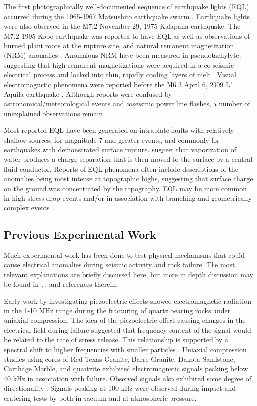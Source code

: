 The first photographically well-documented sequence of earthquake lights (EQL) occurred during the 1965-1967 Matsushiro earthquake swarm \citep{Derr:1973tq}.  Earthquake lights were also observed in the M7.2 November 29, 1975 Kalapana earthquake.  The M7.2 1995 Kobe earthquake was reported to have EQL as well as observations of burned plant roots at the rupture site, and natural remanent magnetization (NRM) anomalies \citep{YujiEnomoto:2007tq}.  Anomalous NRM have been measured in pseudotachylyte, suggesting that high remanent magnetizations were acquired in a co-seismic electrical process and locked into thin, rapidly cooling layers of melt \citep{Ferre:2005ci}.  Visual electromagnetic phenomena were reported before the M6.3 April 6, 2009 L' Aquila earthquake \citep{Fidani:2010ie}. Although reports were confused by astronomical/meteorological events and coseismic power line flashes, a number of unexplained observations remain.

Most reported EQL have been generated on intraplate faults with relatively shallow sources, for magnitude 7 and greater events, and commonly for earthquakes with demonstrated surface rupture.  \citet{Lockner:1983ux} suggest that vaporization of water produces a charge separation that is then moved to the surface by a central fluid conductor.  Reports of EQL phenomena often include descriptions of the anomalies being most intense at topographic highs, suggesting that surface charge on the ground was concentrated by the topography. EQL may be more common in high stress drop events and/or in association with branching and geometrically complex events \citep{scholz2002mechanics}.

\subsection{Previous Experimental Work}

Much experimental work has been done to test physical mechanisms that could cause electrical anomalies during seismic activity and rock failure.  The most relevant explanations are briefly discussed here, but more in depth discussion may be found in \citet{Uyeda:2009du}, \cite{Freund:2000vf}, and references therein.

Early work by \citet{Nitsan:1977te} investigating piezoelectric effects showed electromagnetic radiation in the 1-10 MHz range during the fracturing of quartz bearing rocks under uniaxial compression.  The idea of the piezoelectric effect causing changes in the electrical field during failure suggested that frequency content of the signal would be related to the rate of stress release.  This relationship is supported by a spectral shift to higher frequencies with smaller particles \citep{Nitsan:1977te}.  Uniaxial compression studies using cores of Red Texas Granite, Barre Granite, Dakota Sandstone, Carthage Marble, and quartzite exhibited electromagnetic signals peaking below 40 kHz in association with failure. Observed signals also exhibited some degree of directionality \citep{Rowell:1981tp,Hanson:1982vu}.  Signals peaking at 100 kHz were observed during impact and cratering tests by \citet{Bianchi:1984vf} both in vacuum and at atmospheric pressure.

